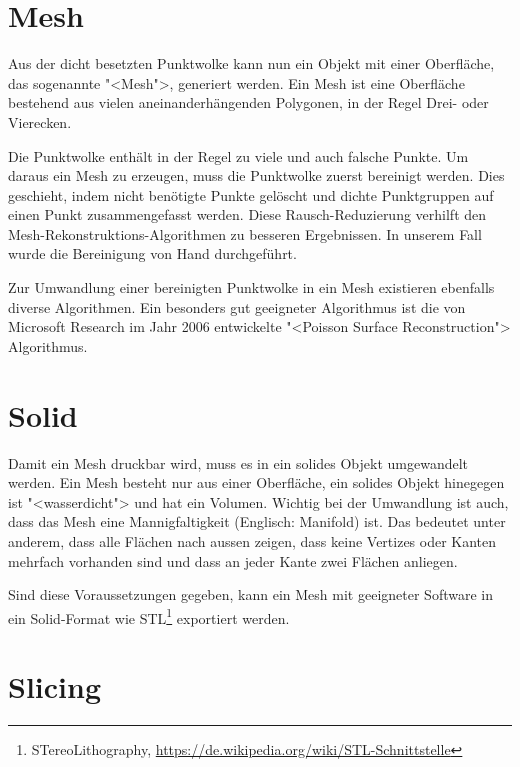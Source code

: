 \section{Mesh}

\label{photogrammetry:mesh}

Aus der dicht besetzten Punktwolke kann nun ein Objekt mit einer Oberfläche, das
sogenannte "<Mesh">, generiert werden. Ein Mesh ist eine Oberfläche bestehend
aus vielen aneinanderhängenden Polygonen, in der Regel Drei- oder Vierecken.

Die Punktwolke enthält in der Regel zu viele und auch falsche Punkte. Um daraus
ein Mesh zu erzeugen, muss die Punktwolke zuerst bereinigt werden. Dies
geschieht, indem nicht benötigte Punkte gelöscht und dichte Punktgruppen auf
einen Punkt zusammengefasst werden. Diese Rausch-Reduzierung verhilft den
Mesh-Rekon\-struk\-tions-Algorithmen zu besseren Ergebnissen. In unserem Fall wurde
die Bereinigung von Hand durchgeführt.

Zur Umwandlung einer bereinigten Punktwolke in ein Mesh existieren ebenfalls
diverse Algorithmen. Ein besonders gut geeigneter Algorithmus ist die von
Microsoft Research im Jahr 2006 entwickelte "<Poisson Surface
Reconstruction">\cite{kazhdan:2006} Algorithmus.


\section{Solid}

Damit ein Mesh druckbar wird, muss es in ein solides Objekt umgewandelt werden.
Ein Mesh besteht nur aus einer Oberfläche, ein solides Objekt hinegegen ist
"<wasserdicht"> und hat ein Volumen. Wichtig bei der Umwandlung ist auch, dass
das Mesh eine Mannigfaltigkeit (Englisch: Manifold) ist. Das bedeutet unter
anderem, dass alle Flächen nach aussen zeigen, dass keine Vertizes oder Kanten
mehrfach vorhanden sind und dass an jeder Kante zwei Flächen anliegen.

Sind diese Voraussetzungen gegeben, kann ein Mesh mit geeigneter Software in
ein Solid-Format wie STL\footnote{STereoLithography,
	\url{https://de.wikipedia.org/wiki/STL-Schnittstelle}} exportiert werden.


\section{Slicing}

